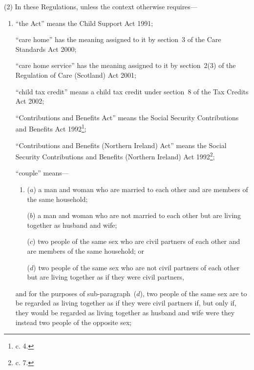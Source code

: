 \documentclass[12pt,a4paper]{article}
\begin{document}
(2) In these Regulations, unless the context otherwise requires—
\begin{enumerate}\item[]
“the Act” means the Child Support Act 1991;

“care home” has the meaning assigned to it by section~3 of the Care Standards Act 2000;

“care home service” has the meaning assigned to it by section~2(3) of the Regulation of Care (Scotland) Act 2001;

“child tax credit” means a child tax credit under section~8 of the Tax Credits Act 2002;

“Contributions and Benefits Act” means the Social Security Contributions and Benefits Act 1992\footnote{ c. 4.};

“Contributions and Benefits (Northern Ireland) Act” means the Social Security Contributions and Benefits (Northern Ireland) Act 1992\footnote{ c. 7.};

%

“couple” means—
\begin{enumerate}\item[]
($a$) 
a man and woman who are married to each other and are members of the same household;

($b$) 
a man and woman who are not married to each other but are living together as husband and wife;

($c$) 
two people of the same sex who are civil partners of each other and are members of the same household; or

($d$) 
two people of the same sex who are not civil partners of each other but are living together as if they were civil partners,
\end{enumerate}
and for the purposes of sub-paragraph~($d$), two people of the same sex are to be regarded as living together as if they were civil partners if, but only if, they would be regarded as living together as husband and wife were they instead two people of the opposite sex;


\end{enumerate}
\end{document}

